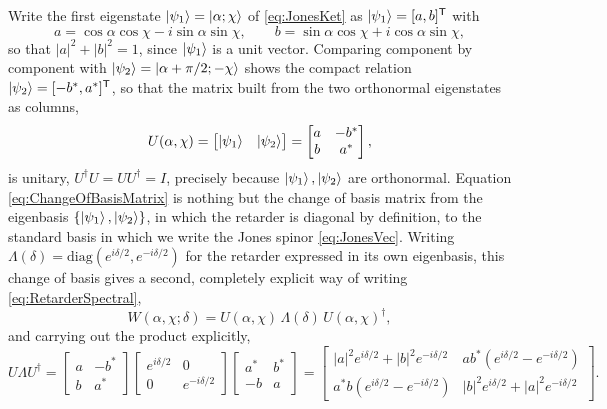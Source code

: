             Write the first eigenstate $\ket{\psi_1}=\ket{\alpha;\chi}$ of \ref{eq:JonesKet} as $\ket{\psi_1}=[a,b]^{\mathsf T}$ with
            \begin{equation*}
                a = \cos\alpha\cos\chi-i\sin\alpha\sin\chi, \qquad b=\sin\alpha\cos\chi+i\cos\alpha\sin\chi,
            \end{equation*}
            so that $|a|^2+|b|^2=1$, since $\ket{\psi_1}$ is a unit vector. Comparing component by component with $\ket{\psi_2}=\ket{\alpha+\pi/2;-\chi}$ shows the compact relation $\ket{\psi_2}=[-b^*,a^*]^{\mathsf T}$, so that the matrix built from the two orthonormal eigenstates as columns,
            \begin{equation}\label{eq:ChangeOfBasisMatrix}
                U(\alpha,\chi) = \begin{bmatrix}\ket{\psi_1} & \ket{\psi_2}\end{bmatrix} = \begin{bmatrix}a & -b^*\\ b & a^*\end{bmatrix},
            \end{equation}
            is unitary, $U^\dagger U=UU^\dagger=I$, precisely because $\ket{\psi_1},\ket{\psi_2}$ are orthonormal. Equation \ref{eq:ChangeOfBasisMatrix} is nothing but the change of basis matrix from the eigenbasis $\{\ket{\psi_1},\ket{\psi_2}\}$, in which the retarder is diagonal by definition, to the standard basis in which we write the Jones spinor \ref{eq:JonesVec}. Writing $\Lambda(\delta)=\mathrm{diag}\left(e^{i\delta/2},e^{-i\delta/2}\right)$ for the retarder expressed in its own eigenbasis, this change of basis gives a second, completely explicit way of writing \ref{eq:RetarderSpectral},
            \begin{equation}\label{eq:RetarderChangeOfBasis}
                W(\alpha,\chi;\delta) = U(\alpha,\chi)\,\Lambda(\delta)\,U(\alpha,\chi)^\dagger,
            \end{equation}
            and carrying out the product explicitly,
            \begin{equation*}
                U\Lambda U^\dagger = \begin{bmatrix}a&-b^*\\b&a^*\end{bmatrix}\begin{bmatrix}e^{i\delta/2}&0\\0&e^{-i\delta/2}\end{bmatrix}\begin{bmatrix}a^*&b^*\\-b&a\end{bmatrix} = \begin{bmatrix}
                    |a|^2e^{i\delta/2}+|b|^2e^{-i\delta/2} & ab^*\left(e^{i\delta/2}-e^{-i\delta/2}\right) \\
                    a^*b\left(e^{i\delta/2}-e^{-i\delta/2}\right) & |b|^2e^{i\delta/2}+|a|^2e^{-i\delta/2}
                \end{bmatrix}.
            \end{equation*}
